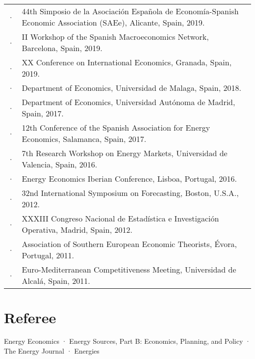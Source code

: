 \documentclass[11pt]{article}\usepackage[]{graphicx}\usepackage[]{color}
\begin{document}
\begin{tabular}{R{0.1cm} L{14cm}}

· & 44th Simposio de la Asociación Española de Economía-Spanish Economic Association (SAEe), Alicante, Spain, 2019.\\[.2cm]

· & II Workshop of the Spanish Macroeconomics Network, Barcelona, Spain, 2019.\\[.2cm]

· &  XX Conference on International Economics, Granada, Spain, 2019.\\[.2cm]
 
· &  Department of Economics, Universidad de Malaga, Spain, 2018.\\[.2cm]
 
· &  Department of Economics, Universidad Autónoma de Madrid, Spain, 2017.\\[.2cm]
 
· &  12th Conference of the Spanish Association for Energy Economics, Salamanca, Spain, 2017.\\[.2cm]
 
· &  7th Research Workshop on Energy Markets, Universidad de Valencia, Spain, 2016.\\[.2cm]
 
· &  Energy Economics Iberian Conference, Lisboa, Portugal, 2016.\\[.2cm]
 
· &  32nd International Symposium on Forecasting, Boston, U.S.A., 2012.\\[.2cm]

· &  XXXIII Congreso Nacional de Estadística e Investigación Operativa, Madrid, Spain, 2012.\\[.2cm]
 
· &  Association of Southern European Economic Theorists, Évora, Portugal, 2011.\\[.2cm]

· &  Euro-Mediterranean Competitiveness Meeting, Universidad de Alcalá, Spain, 2011.\\

\end{tabular}


\section{Referee} 

\raggedright
Energy Economics · Energy Sources, Part B: Economics, Planning, and Policy · The Energy Journal · Energies\\
\end{document}
